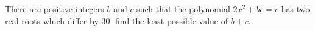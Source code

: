 There are positive integers $b$ and $c$ such that the polynomial ${2x^{2}+bc=c}$ has two real roots which differ by $30$. find the least possible value of $b+c$.
